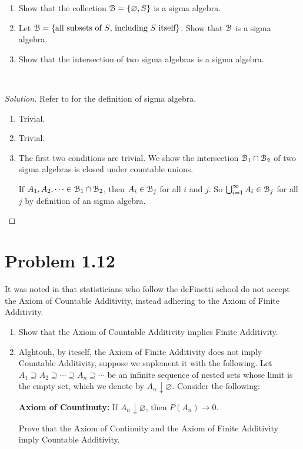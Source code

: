 \documentclass[12pt,letterpaper,reqno]{amsart}
\numberwithin{equation}{subsection}
\let\emptyset\varnothing
\begin{document}
\begin{enumerate}[label=(\alph*),leftmargin=*]
    \item Show that the collection $\mycal{B} = \SETT{\emptyset, S}$ is a sigma algebra.
    
    \item Let $\mathcal{{B}} = \left\{ {\mbox{all subsets of $S$, including $S$ itself}} \right\}$. Show that $\mathcal{{B}}$ is a sigma algebra.
    
    \item Show that the intersection of two sigma algebras is a sigma algebra.
\end{enumerate}~\\

\begin{proof}[Solution] Refer to \cite[Definition 1.2.1 on page 6]{Berger-Casella} for the definition of sigma algebra.

\begin{enumerate}[label=(\alph*),leftmargin=*]
    \item Trivial.
    \item Trivial.
    \item The first two conditions are trivial. We show the intersection $\mathcal{{B}}_1 \cap \mathcal{{B}}_2$ of two sigma algebras is closed under countable unions.
    
    If $A_1, A_2, \cdots \in \mathcal{{B}}_1 \cap \mathcal{{B}}_2$, then $A_i \in \mathcal{{B}}_j$ for all $i$ and $j$. So $\bigcup_{i = 1}^{\infty} A_i \in \mathcal{{B}}_j$ for all $j$ by definition of an sigma algebra.
\end{enumerate}
\end{proof}

\newpage
\section{Problem 1.12}

It was noted in \cite[page 9]{Berger-Casella} that statisticians who follow the deFinetti school do not accept the Axiom of Countable Additivity, instead adhering to the Axiom of Finite Additivity.

\begin{enumerate}[label=(\alph*),leftmargin=*]
    \item Show that the Axiom of Countable Additivity implies Finite Additivity.
    \item Alghtouh, by iteself, the Axiom of Finite Additivity does not imply Countable Additivity, suppose we suplement it with the following. Let $A_1 \supseteq A_2 \supseteq \cdots \supseteq A_n \supseteq \cdots$ be an infinite sequence of nested sets whose limit is the empty set, which we denote by $A_n \downarrow \emptyset$. Consider the following:
    \begin{center}
        {\bf Axiom of Countinuty:} If $A_n \downarrow \emptyset$, then $P(A_n) \rightarrow 0$.
    \end{center}
    Prove that the Axiom of Continuity and the Axiom of Finite Additivity imply Countable Additivity.
\end{enumerate}~\\
\end{document}
